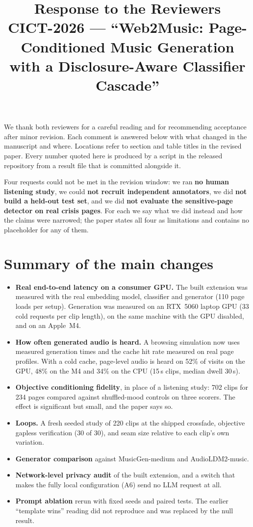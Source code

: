 \documentclass[10pt]{article}
\title{Response to the Reviewers\\[2pt]\large CICT-2026 --- ``Web2Music: Page-Conditioned Music Generation with a Disclosure-Aware Classifier Cascade''}
\author{}
\date{}
\begin{document}
\maketitle
\vspace{-3em}

\noindent We thank both reviewers for a careful reading and for recommending acceptance after
minor revision. Each comment is answered below with what changed in the manuscript and
where. Locations refer to section and table titles in the revised paper. Every number
quoted here is produced by a script in the released repository from a result file that is
committed alongside it.

\medskip
\noindent Four requests could not be met in the revision window: we ran \textbf{no human listening
study}, we could \textbf{not recruit independent annotators}, we did \textbf{not build a
held-out test set}, and we did \textbf{not evaluate the sensitive-page detector on real
crisis pages}. For each we say what we did instead and how the claims were narrowed; the
paper states all four as limitations and contains no placeholder for any of them.

\section*{Summary of the main changes}
\begin{itemize}
\item \textbf{Real end-to-end latency on a consumer GPU.} The built extension was measured
  with the real embedding model, classifier and generator (110 page loads per setup).
  Generation was measured on an RTX~5060 laptop GPU (33 cold requests per clip length), on the
  same machine with the GPU disabled, and on an Apple~M4.
\item \textbf{How often generated audio is heard.} A browsing simulation now uses measured
  generation times and the cache hit rate measured on real page profiles. With a cold cache,
  page-level audio is heard on 52\% of visits on the GPU, 48\% on the M4 and 34\% on the CPU
  (15\,s clips, median dwell 30\,s).
\item \textbf{Objective conditioning fidelity}, in place of a listening study: 702 clips for
  234 pages compared against shuffled-mood controls on three scorers. The effect is
  significant but small, and the paper says so.
\item \textbf{Loops.} A fresh seeded study of 220 clips at the shipped crossfade, objective
  gapless verification (30 of 30), and seam size relative to each clip's own variation.
\item \textbf{Generator comparison} against MusicGen-medium and AudioLDM2-music.
\item \textbf{Network-level privacy audit} of the built extension, and a switch that
  makes the fully local configuration (A6) send no LLM request at all.
\item \textbf{Prompt ablation} rerun with fixed seeds and paired tests. The earlier ``template wins''
  reading did not reproduce and was replaced by the null result.
\end{itemize}
\end{document}

